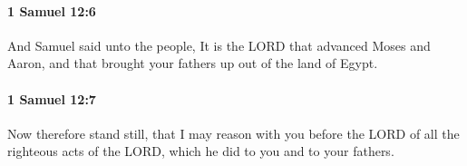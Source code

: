 		\paragraph{1 Samuel 12:6} %
			\label{1SAMUEL-12-6}

			And Samuel said unto the people, It is the LORD that advanced Moses and Aaron, and that brought your fathers up out of the land of Egypt.


		\paragraph{1 Samuel 12:7} %
			\label{1SAMUEL-12-7}

			Now therefore stand still, that I may reason with you before the LORD of all the righteous acts of the LORD, which he did to you and to your fathers.


